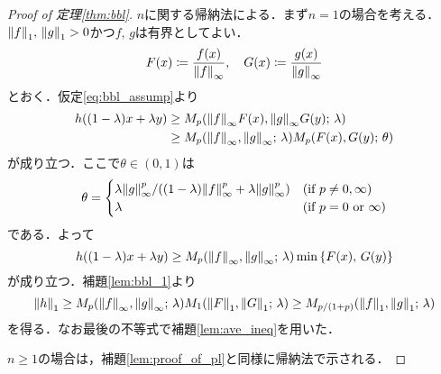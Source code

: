 \documentclass[a4j]{ltjsarticle}
\newcommand{\1}{\bm{1}}
\newcommand{\M}[4]{M_{#1}\qty(#2,#3;\,#4)}
\numberwithin{equation}{section}
\theoremstyle{definition}
\begin{document}
\begin{proof}[Proof of \textup{定理\ref{thm:bbl}}]
    $n$に関する帰納法による．まず$n=1$の場合を考える．$\norm{f}_1,\,\norm{g}_1>0$かつ$f,\,g$は有界としてよい．
    \begin{equation}
        F(x)\coloneqq \frac{f(x)}{\norm{f}_{\infty}},\quad G(x)\coloneqq \frac{g(x)}{\norm{g}_{\infty}}
    \end{equation}
    とおく．仮定\eqref{eq:bbl_assump}より
    \begin{align}
        h((1-\lambda)x+\lambda y)&\geq \M{p}{\norm{f}_{\infty}F(x)}{\norm{g}_{\infty}G(y)}{\lambda}\\
        &\geq \M{p}{\norm{f}_{\infty}}{\norm{g}_{\infty}}{\lambda}\M{p}{F(x)}{G(y)}{\theta}
    \end{align}
    が成り立つ．ここで$\theta\in(0,1)$は
    \begin{equation}
        \theta=\begin{cases}
            \lambda\norm{g}_{\infty}^p/((1-\lambda)\norm{f}_{\infty}^p+\lambda \norm{g}_{\infty}^p) & (\text{if $p\neq 0,\infty$})\\
            \lambda & (\text{if $p=0$ or $\infty$})
        \end{cases}
    \end{equation}
    である．よって
    \begin{equation}
        h((1-\lambda)x+\lambda y)\geq \M{p}{\norm{f}_{\infty}}{\norm{g}_{\infty}}{\lambda}\min\qty{F(x),\,G(y)}
    \end{equation}
    が成り立つ．補題\ref{lem:bbl_1}より
    \begin{equation}
        \norm{h}_{1}\geq \M{p}{\norm{f}_{\infty}}{\norm{g}_{\infty}}{\lambda}\M{1}{\norm{F}_{1}}{\norm{G}_1}{\lambda}\geq \M{p/(1+p)}{\norm{f}_{1}}{\norm{g}_{1}}{\lambda} 
    \end{equation}
    を得る．なお最後の不等式で補題\ref{lem:ave_ineq}を用いた．

    $n\geq 1$の場合は，補題\ref{lem:proof_of_pl}と同様に帰納法で示される．
\end{proof}
\end{document}

